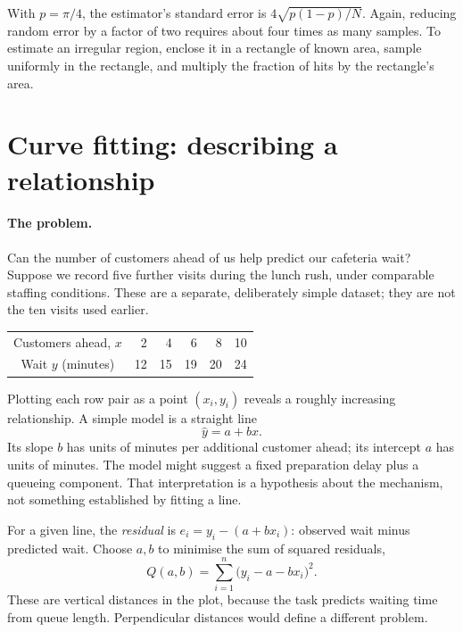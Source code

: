 With $p=\pi/4$, the estimator's standard error is
$4\sqrt{p(1-p)/N}$. Again, reducing random error by a factor of two requires
about four times as many samples. To estimate an irregular region, enclose
it in a rectangle of known area, sample uniformly in the rectangle, and
multiply the fraction of hits by the rectangle's area.

\section{Curve fitting: describing a relationship}
\label{sec:ds-fitting}
\paragraph{The problem.}
Can the number of customers ahead of us help predict our cafeteria wait?
Suppose we record five further visits during the lunch rush, under
comparable staffing conditions. These are a separate, deliberately simple
dataset; they are not the ten visits used earlier.
\begin{center}
\begin{tabular}{c rrrrr}
\toprule
Customers ahead, $x$ & 2 & 4 & 6 & 8 & 10\\
Wait $y$ (minutes) & 12 & 15 & 19 & 20 & 24\\
\bottomrule
\end{tabular}
\end{center}
Plotting each row pair as a point $(x_i,y_i)$ reveals a roughly increasing
relationship. A simple model is a straight line
\[
 \widehat y=a+bx.
\]
Its slope $b$ has units of minutes per additional customer ahead; its intercept $a$ has
units of minutes. The model might suggest a fixed preparation delay plus a queueing
component. That interpretation is a hypothesis about the mechanism,
not something established by fitting a line.

For a given line, the \emph{residual} is
$e_i=y_i-(a+bx_i)$: observed wait minus predicted wait. Choose $a,b$ to
minimise the sum of squared residuals,
\[
 Q(a,b)=\sum_{i=1}^{n}\bigl(y_i-a-bx_i\bigr)^2.
\]
These are vertical distances in the plot, because the task predicts waiting time
from queue length. Perpendicular distances would define a different problem.

